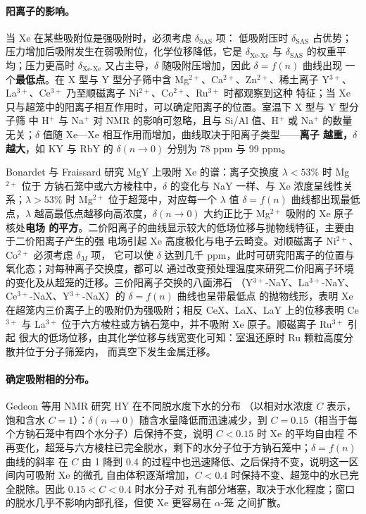 \paragraph{阳离子的影响。}当 Xe 在某些吸附位是强吸附时，必须考虑 $\delta_{\mathrm{SAS}}$ 项：
低吸附压时 $\delta_{\mathrm{SAS}}$ 占优势；压力增加后吸附发生在弱吸附位，化学位移降低，它是
$\delta_{\mathrm{Xe\text{-}Xe}}$ 与 $\delta_{\mathrm{SAS}}$ 的权重平均；压力更高时
$\delta_{\mathrm{Xe\text{-}Xe}}$ 又占主导，$\delta$ 随吸附压增加，因此 $\delta=f(n)$ 曲线出现
一个\textbf{最低点}。在 X 型与 Y 型分子筛中含 Mg$^{2+}$、Ca$^{2+}$、Zn$^{2+}$、稀土离子
Y$^{3+}$、La$^{3+}$、Ce$^{3+}$ 乃至顺磁离子 Ni$^{2+}$、Co$^{2+}$、Ru$^{3+}$ 时都观察到这种
特征；当 Xe 只与超笼中的阳离子相互作用时，可以确定阳离子的位置。室温下 X 型与 Y 型分子筛
中 H$^{+}$ 与 Na$^{+}$ 对  NMR 的影响可忽略，且与 Si/Al 值、H$^{+}$ 或
Na$^{+}$ 的数量无关；$\delta$ 值随 Xe—Xe 相互作用而增加，曲线取决于阳离子类型——\textbf{离子
越重，$\delta$ 越大}，如 KY 与 RbY 的 $\delta(n\to0)$ 分别为 78 ppm 与 99 ppm。

Bonardet 与 Fraissard 研究 MgY 上吸附 Xe 的谱：离子交换度 $\lambda<53\%$ 时 Mg$^{2+}$ 位于
方钠石笼中或六方棱柱中，$\delta$ 的变化与 NaY 一样、与 Xe 浓度呈线性关系；$\lambda>53\%$
时 Mg$^{2+}$ 位于超笼中，对应每一个 $\lambda$ 值 $\delta=f(n)$ 曲线都出现最低点，$\lambda$
越高最低点越移向高浓度，$\delta(n\to0)$ 大约正比于 Mg$^{2+}$ 吸附的 Xe 原子核处\textbf{电场
的平方}。二价阳离子的曲线显示较大的低场位移与抛物线特征，主要由于二价阳离子产生的强
电场引起 Xe 高度极化与电子云畸变。对顺磁离子 Ni$^{2+}$、Co$^{2+}$ 必须考虑 $\delta_{M}$ 项，
它可以使 $\delta$ 达到几千 ppm，此时可研究阳离子的位置与氧化态；对每种离子交换度，都可以
通过改变预处理温度来研究二价阳离子环境的变化及从超笼的迁移。三价阳离子交换的八面沸石
（Y$^{3+}$-NaY、La$^{3+}$-NaY、Ce$^{3+}$-NaX、Y$^{3+}$-NaX）的 $\delta=f(n)$ 曲线也呈带最低点
的抛物线形，表明 Xe 在超笼内三价离子上的吸附仍为强吸附；相反 CeX、LaX、LaY 上的位移表明
Ce$^{3+}$ 与 La$^{3+}$ 位于六方棱柱或方钠石笼中，并不吸附 Xe 原子。顺磁离子 Ru$^{3+}$ 引起
很大的低场位移，由其化学位移与线宽变化可知：室温还原时 Ru 颗粒高度分散并位于分子筛笼内，
而真空下发生金属迁移。

\paragraph{确定吸附相的分布。}Gedeon 等用  NMR 研究 HY 在不同脱水度下水的分布
（以相对水浓度 $C$ 表示，饱和含水 $C=1$）：$\delta(n\to0)$ 随含水量降低而迅速减少，到
$C=0.15$（相当于每个方钠石笼中有四个水分子）后保持不变，说明 $C<0.15$ 时 Xe 的平均自由程
不再变化，超笼与六方棱柱已完全脱水，剩下的水分子位于方钠石笼中；$\delta=f(n)$ 曲线的斜率
在 $C$ 由 1 降到 0.4 的过程中也迅速降低、之后保持不变，说明这一区间内可吸附 Xe 的微孔
自由体积逐渐增加，$C<0.4$ 时保持不变、超笼中的水已完全脱除。因此 $0.15<C<0.4$ 时水分子对
孔有部分堵塞，取决于水化程度；窗口的脱水几乎不影响内部孔径，但使 Xe 更容易在 $\alpha$-笼
之间扩散。

